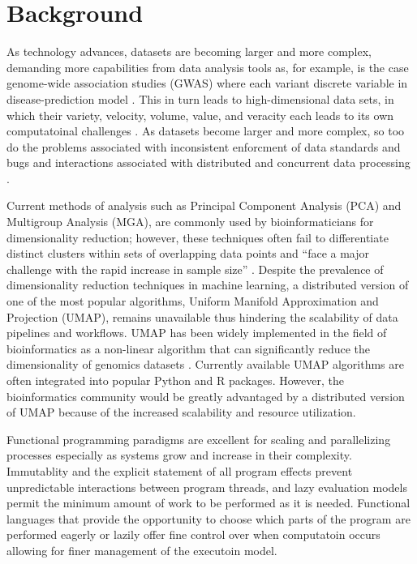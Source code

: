 \documentclass[11pt,letterpaper]{article}
\begin{document}

\section{Background}

As technology advances, datasets are becoming larger and more complex,
demanding more capabilities from data analysis tools as, for example,
is the case genome-wide association studies (GWAS) where each variant
discrete variable in disease-prediction model
\parencite{huang2018high}. This in turn leads to high-dimensional data
sets, in which their variety, velocity, volume, value, and veracity
each leads to its own computatoinal challenges
\parencite{anuradha2015brief}. As datasets become larger and more
complex, so too do the problems associated with inconsistent
enforcment of data standards and bugs and interactions associated with
distributed and concurrent data processing \parencite{Schadt_2010}.

Current methods of analysis such as Principal Component Analysis (PCA)
and Multigroup Analysis (MGA), are commonly used by bioinformaticians
for dimensionality reduction; however, these techniques often fail to
differentiate distinct clusters within sets of overlapping data points
and ``face a major challenge with the rapid increase in sample size''
\parencite{yang2021dimensionality}. Despite the prevalence of
dimensionality reduction techniques in machine learning, a distributed
version of one of the most popular algorithms, Uniform Manifold
Approximation and Projection (UMAP), remains unavailable thus
hindering the scalability of data pipelines and workflows. UMAP has
been widely implemented in the field of bioinformatics as a non-linear
algorithm that can significantly reduce the dimensionality of genomics
datasets \parencite{bollon2022investigating}. Currently available UMAP
algorithms are often integrated into popular Python and R
packages. However, the bioinformatics community would be greatly
advantaged by a distributed version of UMAP because of the increased
scalability and resource utilization.

Functional programming paradigms are excellent for scaling and
parallelizing processes especially as systems grow and increase in
their complexity. Immutablity and the explicit statement of all
program effects prevent unpredictable interactions between program
threads, and lazy evaluation models permit the minimum amount of work
to be performed as it is needed. Functional languages that provide the
opportunity to choose which parts of the program are performed eagerly
or lazily offer fine control over when computatoin occurs allowing for
finer management of the executoin model.
\end{document}
